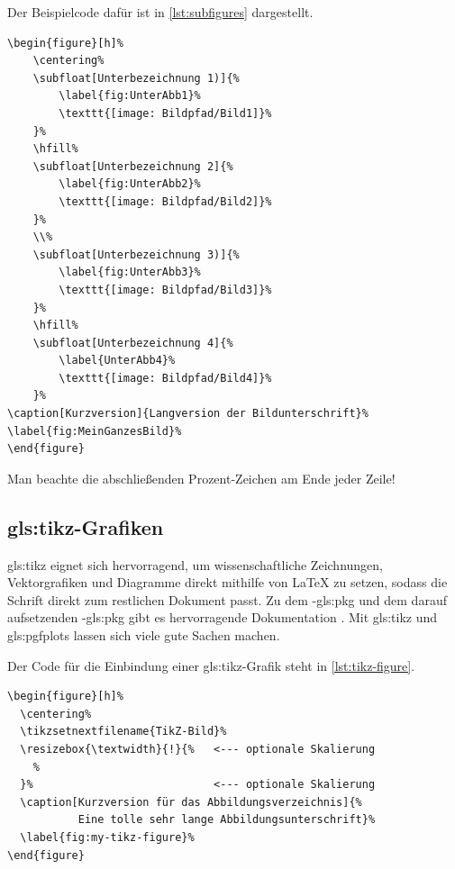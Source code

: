 Der Beispielcode dafür ist in \cref{lst:subfigures} dargestellt.

\begin{lstlisting}[caption={Unterabbildungen in LaTeX},label={lst:subfigures},language={[LaTeX]TeX},float={htbp}]
\begin{figure}[h]%
	\centering%
	\subfloat[Unterbezeichnung 1)]{%
		\label{fig:UnterAbb1}%
		\texttt{[image: Bildpfad/Bild1]}%
	}%
	\hfill%
	\subfloat[Unterbezeichnung 2]{%
		\label{fig:UnterAbb2}%
		\texttt{[image: Bildpfad/Bild2]}%
	}%
	\\%
	\subfloat[Unterbezeichnung 3)]{%
		\label{fig:UnterAbb3}%
		\texttt{[image: Bildpfad/Bild3]}%
	}%
	\hfill%
	\subfloat[Unterbezeichnung 4]{%
		\label{UnterAbb4}%
		\texttt{[image: Bildpfad/Bild4]}%
	}%
\caption[Kurzversion]{Langversion der Bildunterschrift}%
\label{fig:MeinGanzesBild}%
\end{figure}
\end{lstlisting}

Man beachte die abschließenden Prozent-Zeichen am Ende jeder Zeile!

\subsection[TikZ-Grafiken]{\gls{gls:tikz}-Grafiken}%
\label{sec:TikZ}
%
\Gls{gls:tikz} eignet sich hervorragend, um wissenschaftliche Zeichnungen,
Vektorgrafiken und Diagramme direkt mithilfe von LaTeX
zu setzen, sodass die Schrift direkt zum restlichen Dokument passt.
Zu dem -\gls{gls:pkg} und dem darauf aufsetzenden -\gls{gls:pkg} gibt
es hervorragende Dokumentation \parencites{Tantau2013}{Feuersaenger2014}.
Mit \gls{gls:tikz} und \gls{gls:pgfplots} lassen sich viele gute Sachen machen.


Der Code für die Einbindung einer \gls{gls:tikz}-Grafik steht in \cref{lst:tikz-figure}.
\begin{lstlisting}[caption={Einbindung einer TikZ-Zeichnung in LaTeX},label={lst:tikz-figure},language={[LaTeX]TeX},float={htbp}]
\begin{figure}[h]%
  \centering%
  \tikzsetnextfilename{TikZ-Bild}%
  \resizebox{\textwidth}{!}{%   <--- optionale Skalierung
    %
  }%                            <--- optionale Skalierung
  \caption[Kurzversion für das Abbildungsverzeichnis]{%
           Eine tolle sehr lange Abbildungsunterschrift}%
  \label{fig:my-tikz-figure}%
\end{figure}
\end{lstlisting}

